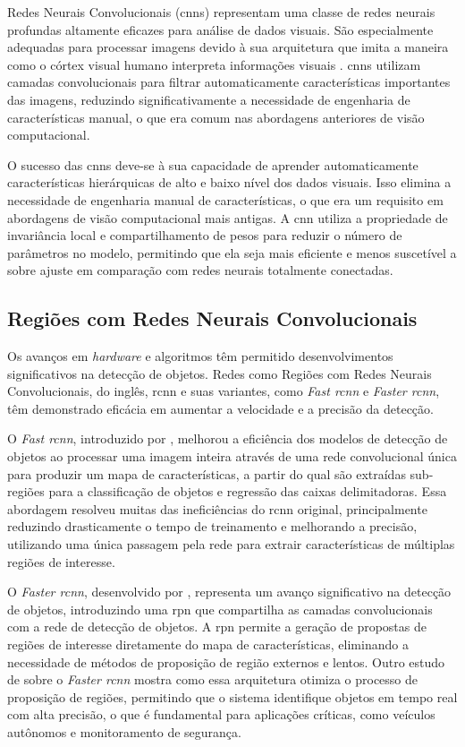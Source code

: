Redes Neurais Convolucionais (\gls{cnn}s) representam uma classe de redes neurais profundas altamente eficazes para análise de dados visuais. São especialmente adequadas para processar imagens devido à sua arquitetura que imita a maneira como o córtex visual humano interpreta informações visuais \cite{lecun1998gradient}. \gls{cnn}s utilizam camadas convolucionais para filtrar automaticamente características importantes das imagens, reduzindo significativamente a necessidade de engenharia de características manual, o que era comum nas abordagens anteriores de visão computacional.

O sucesso das \gls{cnn}s deve-se à sua capacidade de aprender automaticamente características hierárquicas de alto e baixo nível dos dados visuais. Isso elimina a necessidade de engenharia manual de características, o que era um requisito em abordagens de visão computacional mais antigas. A \gls{cnn} utiliza a propriedade de invariância local e compartilhamento de pesos para reduzir o número de parâmetros no modelo, permitindo que ela seja mais eficiente e menos suscetível a sobre ajuste em comparação com redes neurais totalmente conectadas.

 \subsection{Regiões com Redes Neurais Convolucionais}\label{subsec:rcnns}

 Os avanços em \textit{hardware} e algoritmos têm permitido desenvolvimentos significativos na detecção de objetos. Redes como Regiões com Redes Neurais Convolucionais, do inglês, \gls{rcnn} e suas variantes, como \textit{Fast \gls{rcnn}} e \textit{Faster \gls{rcnn}}, têm demonstrado eficácia em aumentar a velocidade e a precisão da detecção. 

  O \textit{Fast \gls{rcnn}}, introduzido por , melhorou a eficiência dos modelos de detecção de objetos ao processar uma imagem inteira através de uma rede convolucional única para produzir um mapa de características, a partir do qual são extraídas sub-regiões para a classificação de objetos e regressão das caixas delimitadoras. Essa abordagem resolveu muitas das ineficiências do \gls{rcnn} original, principalmente reduzindo drasticamente o tempo de treinamento e melhorando a precisão, utilizando uma única passagem pela rede para extrair características de múltiplas regiões de interesse.

  O \textit{Faster \gls{rcnn}}, desenvolvido por , representa um avanço significativo na detecção de objetos, introduzindo uma \gls{rpn} que compartilha as camadas convolucionais com a rede de detecção de objetos. A \gls{rpn} permite a geração de propostas de regiões de interesse diretamente do mapa de características, eliminando a necessidade de métodos de proposição de região externos e lentos. Outro estudo de  sobre o \textit{Faster \gls{rcnn}} mostra como essa arquitetura otimiza o processo de proposição de regiões, permitindo que o sistema identifique objetos em tempo real com alta precisão, o que é fundamental para aplicações críticas, como veículos autônomos e monitoramento de segurança.


